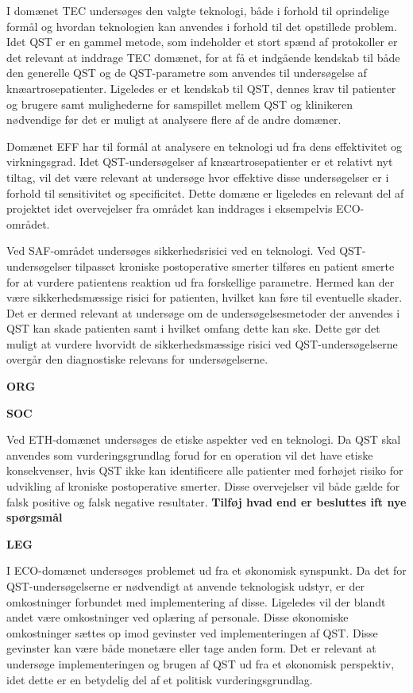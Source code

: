 I domænet TEC undersøges den valgte teknologi, både i forhold til oprindelige formål og hvordan teknologien kan anvendes i forhold til det opstillede problem. Idet QST er en gammel metode, som indeholder et stort spænd af protokoller er det relevant at inddrage TEC domænet, for at få et indgående kendskab til både den generelle QST og de QST-parametre som anvendes til undersøgelse af knæartrosepatienter. Ligeledes er et kendskab til QST, dennes krav til patienter og brugere samt mulighederne for samspillet mellem QST og klinikeren nødvendige før det er muligt at analysere flere af de andre domæner. 

Domænet EFF har til formål at analysere en teknologi ud fra dens effektivitet og virkningsgrad. Idet QST-undersøgelser af knæartrosepatienter er et relativt nyt tiltag, vil det være relevant at undersøge hvor effektive disse undersøgelser er i forhold til sensitivitet og specificitet. Dette domæne er ligeledes en relevant del af projektet idet overvejelser fra området kan inddrages i eksempelvis ECO-området.   


Ved SAF-området undersøges sikkerhedsrisici ved en teknologi. Ved QST-undersøgelser tilpasset kroniske postoperative smerter tilføres en patient smerte for at vurdere patientens reaktion ud fra forskellige parametre. Hermed kan der være sikkerhedsmæssige risici for patienten, hvilket kan føre til eventuelle skader. Det er dermed relevant at undersøge om de undersøgelsesmetoder der anvendes i QST kan skade patienten samt i hvilket omfang dette kan ske. Dette gør det muligt at vurdere hvorvidt de sikkerhedsmæssige risici ved QST-undersøgelserne overgår den diagnostiske relevans for undersøgelserne. 

\textbf{ORG}

\textbf{SOC}

Ved ETH-domænet undersøges de etiske aspekter ved en teknologi. Da QST skal anvendes som vurderingsgrundlag forud for en operation vil det have etiske konsekvenser, hvis QST ikke kan identificere alle patienter med forhøjet risiko for udvikling af kroniske postoperative smerter. Disse overvejelser vil både gælde for falsk positive og falsk negative resultater. \textbf{Tilføj hvad end er besluttes ift nye spørgsmål}       

\textbf{LEG}

I ECO-domænet undersøges problemet ud fra et økonomisk synspunkt. Da det for QST-undersøgelserne er nødvendigt at anvende teknologisk udstyr, er der omkostninger forbundet med implementering af disse. Ligeledes vil der blandt andet være omkostninger ved oplæring af personale. Disse økonomiske omkostninger sættes op imod gevinster ved implementeringen af QST. Disse gevinster kan være både monetære eller tage anden form. Det er relevant at undersøge implementeringen og brugen af QST ud fra et økonomisk perspektiv, idet dette er en betydelig del af et politisk vurderingsgrundlag. 

